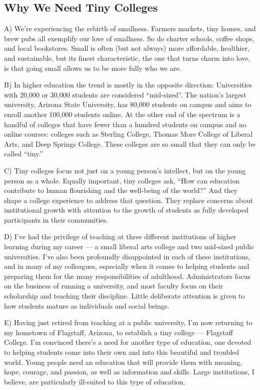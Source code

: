 \documentclass[UTF8,11pt]{ctexart}
\begin{document}
\subsection*{\textbf{Why We Need Tiny Colleges}}


A) We’re experiencing the rebirth of smallness. Farmers markets, tiny homes, and brew pubs all exemplify our love of smallness. So do charter schools, coffee shops, and local bookstores. Small is often (but not always) more affordable, healthier, and sustainable, but its finest characteristic, the one that turns charm into love, is that going small allows us to be more fully who we are.


B) In higher education the trend is mostly in the opposite direction: Universities with 20,000 or 30,000 students are considered “mid-sized”. The nation’s largest university, Arizona State University, has 80,000 students on campus and aims to enroll another 100,000 students online. At the other end of the spectrum is a handful of colleges that have fewer than a hundred students on campus and no online courses: colleges such as Sterling College, Thomas More College of Liberal Arts, and Deep Springs College. These colleges are so small that they can only be called “tiny.”


C) Tiny colleges focus not just on a young person’s intellect, but on the young person as a whole. Equally important, tiny colleges ask, “How can education contribute to human flourishing and the well-being of the world?” And they shape a college experience to address that question. They replace concerns about institutional growth with attention to the growth of students as fully developed participants in their communities.


D) I’ve had the privilege of teaching at three different institutions of higher learning during my career — a small liberal arts college and two mid-sized public universities. I’ve also been profoundly disappointed in each of these institutions, and in many of my colleagues, especially when it comes to helping students and preparing them for the many responsibilities of adulthood. Administrators focus on the business of running a university, and most faculty focus on their scholarship and teaching their discipline. Little deliberate attention is given to how students mature as individuals and social beings.


E) Having just retired from teaching at a public university, I’m now returning to my hometown of Flagstaff, Arizona, to establish a tiny college — Flagstaff College. I’m convinced there’s a need for another type of education, one devoted to helping students come into their own and into this beautiful and troubled world. Young people need an education that will provide them with meaning, hope, courage, and passion, as well as information and skills. Large institutions, I believe, are particularly ill-suited to this type of education.
\end{document}
